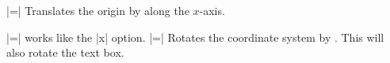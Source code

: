 \begin{command}{\pgftext{}}
\begin{itemize}
    |=|
      Translates the origin by  along the $x$-axis.
\begin{codeexample}[]
\end{codeexample}
  |=|
    works like the |x| option.
  |=|
    Rotates the coordinate system by . This will also
    rotate the text box.
\begin{codeexample}[]
\end{codeexample}
  \end{itemize}
  
\end{command}


